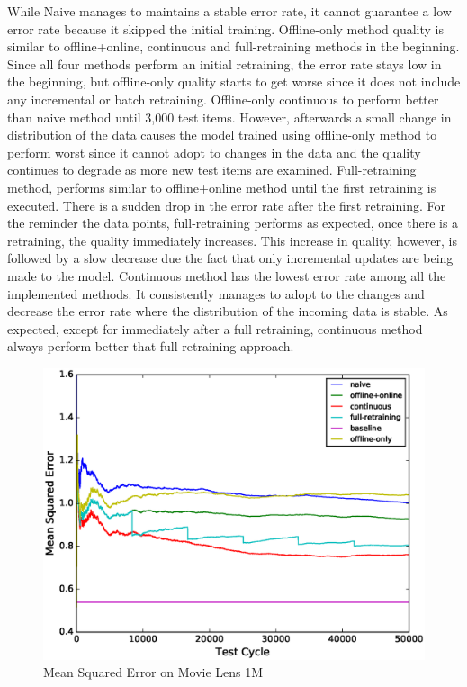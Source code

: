 \documentclass{sig-alternate-05-2015}
\begin{document}
While Naive manages to maintains a stable error rate, it cannot guarantee a low error rate because it skipped the initial training.
Offline-only method quality is similar to offline+online, continuous and full-retraining methods in the beginning. 
Since all four methods perform an initial retraining, the error rate stays low in the beginning, but offline-only quality starts to get worse since it does not include any incremental or batch retraining.
Offline-only continuous to perform better than naive method until 3,000 test items.
However, afterwards a small change in distribution of the data causes the model trained using offline-only method to perform worst since it cannot adopt to changes in the data and the quality continues to degrade as more new test items are examined.
Full-retraining method, performs similar to offline+online method until the first retraining is executed.
There is a sudden drop in the error rate after the first retraining.
For the reminder the data points, full-retraining performs as expected, once there is a retraining, the quality immediately increases.
This increase in quality, however, is followed by a slow decrease due the fact that only incremental updates are being made to the model.
Continuous method has the lowest error rate among all the implemented methods.
It consistently manages to adopt to the changes and decrease the error rate where the distribution of the incoming data is stable.
As expected, except for immediately after a full retraining, continuous method always perform better that full-retraining approach.

\begin{figure}[!ht]
\centering
\includegraphics[width=\columnwidth]{../images/experiment-results/movie-lens-1m-quality.eps}
\caption{Mean Squared Error on Movie Lens 1M}
\label{fig:movie-lens-1M-score}
\end{figure}
\end{document}
